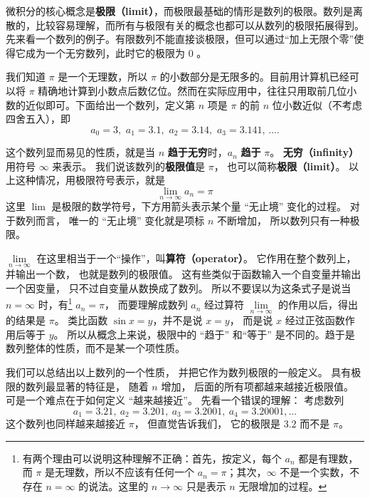 
微积分的核心概念是\textbf{极限（limit）}，而极限最基础的情形是数列的极限。数列是离散的，比较容易理解，而所有与极限有关的概念也都可以从数列的极限拓展得到。 先来看一个数列的例子。有限数列不能直接谈极限，但可以通过“加上无限个零”使得它成为一个无穷数列，此时它的极限为 $0$ 。

\begin{example}{}\label{Lim0_ex1}
我们知道 $\pi$ 是一个无理数，所以 $\pi$ 的小数部分是无限多的。目前用计算机已经可以将 $\pi$ 精确地计算到小数点后数亿位。然而在实际应用中，往往只用取前几位小数的近似即可。下面给出一个数列，定义第 $n$ 项是 $\pi$ 的前 $n$ 位小数近似（不考虑四舍五入），即
\begin{equation}\label{Lim0_eq1}
a_0 = 3,\,\, a_1 = 3.1,\,\, a_2 = 3.14,\,\, a_3 = 3.141,\,\dots.
\end{equation}

这个数列显而易见的性质，就是当 $n$ \textbf{趋于无穷}时，$a_n$ \textbf{趋于} $\pi$。 \textbf{无穷（infinity）}用符号 $\infty$ 来表示。 我们说该数列的\textbf{极限值}是 $\pi$， 也可以简称\textbf{极限（limit）}。 以上这种情况，用极限符号表示，就是
\begin{equation}
\lim_{n \to \infty } {a_n} = \pi 
\end{equation}
这里 $\lim$ 是极限的数学符号，下方用箭头表示某个量 “无止境” 变化的过程。 对于数列而言， 唯一的 “无止境” 变化就是项标 $n$ 不断增加， 所以数列只有一种极限。
\end{example}

$\lim\limits_{n \to \infty }$ 在这里相当于一个“操作”，叫\textbf{算符（operator）}。 它作用在整个数列上，并输出一个数， 也就是数列的极限值。 这有些类似于函数输入一个自变量并输出一个因变量， 只不过自变量从数换成了数列。 所以不要误以为这条式子是说当 $n = \infty$ 时，有\footnote{有两个理由可以说明这种理解不正确：首先，按定义，每个 $a_n$ 都是有理数，而 $\pi$ 是无理数，所以不应该有任何一个 $a_n=\pi$；其次，$\infty$ 不是一个实数，不存在 $n=\infty$ 的说法。这里的 $n\to\infty$ 只是表示 $n$ 无限增加的过程。} $a_n=\pi$， 而要理解成数列 $a_n$ 经过算符 $\lim\limits_{n \to \infty }$ 的作用以后，得出的结果是 $\pi$。 类比函数 $\sin x = y$，并不是说 $x=y$， 而是说 $x$ 经过正弦函数作用后等于 $y$。 所以从概念上来说，极限中的 “趋于” 和“等于” 是不同的。趋于是数列整体的性质，而不是某一个项性质。

我们可以总结出以上数列的一个性质， 并把它作为数列极限的一般定义。 具有极限的数列最显著的特征是， 随着 $n$ 增加， 后面的所有项都越来越接近极限值。 可是一个难点在于如何定义 “越来越接近”。 先看一个错误的理解： 考虑数列
\begin{equation}\label{Lim0_eq2}
a_1 = 3.21,\ a_2 = 3.201,\ a_3 = 3.2001,\ a_4 = 3.20001, \dots
\end{equation}
这个数列也同样越来越接近 $\pi$， 但直觉告诉我们， 它的极限是 $3.2$ 而不是 $\pi$。

